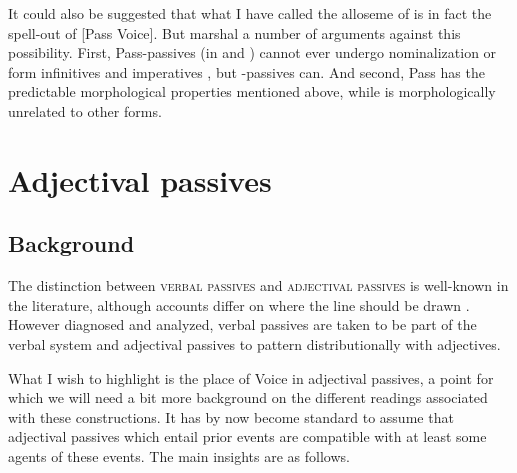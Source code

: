 \begin{exe}
\begin{xlist}
\begin{exe}
\begin{xlist}
\begin{exe}
\begin{exe}
\begin{xlist}
\begin{exe}
\begin{exe}
\begin{xlist}
\begin{exe}
\begin{xlist}
\begin{exe}
\begin{xlist}
\begin{exe}
\begin{xlist}
\begin{exe}
\begin{xlist}
\begin{xlist}
It could also be suggested that what I have called the  alloseme of {\vz} is in fact the spell-out of [Pass Voice]. But \cite{ahdoutkastner19nels} marshal a number of arguments against this possibility. First, Pass-passives (in {\tpua} and {\thif}) cannot ever undergo nominalization or form infinitives and imperatives \citep{kastnerzu17}, but {\vz}-passives can. And second, Pass has the predictable morphological properties mentioned above, while {\vz} is morphologically unrelated to other forms.\label{r1:5:4}


\section{Adjectival passives} \label{passn:adjpass}

	\subsection{Background}

The distinction between \textsc{verbal passives} and \textsc{adjectival passives} is well-known in the literature, although accounts differ on where the line should be drawn \citep{wasow77,levinrappaport86,borerwexler87,embick04li,alexiadouetal14,layering15,bruening14nllt}. However diagnosed and analyzed, verbal passives are taken to be part of the verbal system and adjectival passives to pattern distributionally with adjectives.

What I wish to highlight is the place of Voice in adjectival passives, a point for which we will need a bit more background on the different readings associated with these constructions. It has by now become standard to assume that adjectival passives which entail prior events are compatible with at least some agents of these events. The main insights are as follows.


\end{xlist}
\end{xlist}
\end{exe}
\end{xlist}
\end{exe}
\end{xlist}
\end{exe}
\end{xlist}
\end{exe}
\end{xlist}
\end{exe}
\end{exe}
\end{xlist}
\end{exe}
\end{exe}
\end{xlist}
\end{exe}
\end{xlist}
\end{exe}
